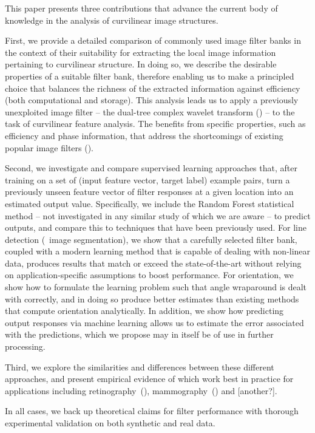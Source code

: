 This paper presents three contributions that advance the current body of knowledge in the analysis of curvilinear image structures.

First, we provide a detailed comparison of commonly used image filter banks in the context of their suitability for extracting the local image information pertaining to curvilinear structure. In doing so, we describe the desirable properties of a suitable filter bank, therefore enabling us to make a principled choice that balances the richness of the extracted information against efficiency (both computational and storage). This analysis leads us to apply a previously unexploited image filter -- the dual-tree complex wavelet transform (\dtcwt{}) -- to the task of curvilinear feature analysis. The \dtcwt{} benefits from specific properties, such as efficiency and phase information, that address the shortcomings of existing popular image filters ().

Second, we investigate and compare supervised learning approaches that, after training on a set of (input feature vector, target label) example pairs, turn a previously unseen feature vector of filter responses at a given location into an estimated output value. Specifically, we include the Random Forest statistical method -- not investigated in any similar study of which we are aware -- to predict outputs, and compare this to techniques that have been previously used. For line detection (\ie~image segmentation), we show that a carefully selected filter bank, coupled with a modern learning method that is capable of dealing with non-linear data, produces results that match or exceed the state-of-the-art without relying on application-specific assumptions to boost performance. For orientation, we show how to formulate the learning problem such that angle wraparound is dealt with correctly, and in doing so produce better estimates than existing methods that compute orientation analytically. In addition, we show how predicting output responses via machine learning allows us to estimate the error associated with the predictions, which we propose may in itself be of use in further processing.

Third, we explore the similarities and differences between these different approaches, and present empirical evidence of which work best in practice for applications including retinography~(), mammography~() and [another?].

In all cases, we back up theoretical claims for filter performance with thorough experimental validation on both synthetic and real data. 

